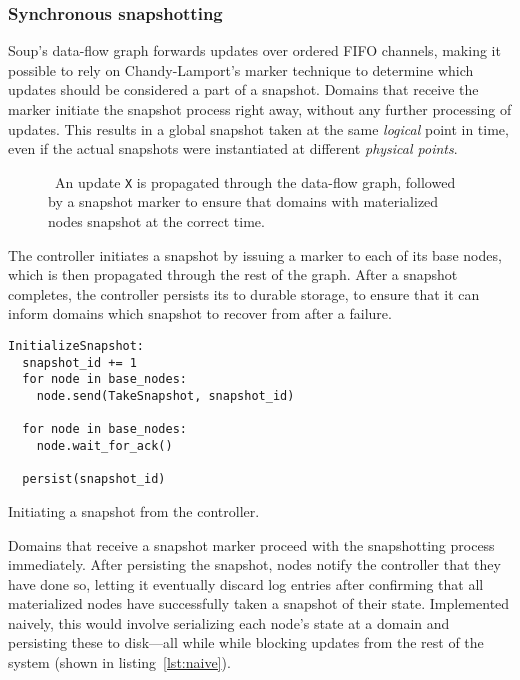 \subsubsection{Synchronous snapshotting}

Soup's data-flow graph forwards updates over ordered FIFO channels, making it
possible to rely on Chandy-Lamport's marker technique to determine which updates
should be considered a part of a snapshot. Domains that receive the
marker initiate the snapshot process right away, without any further processing
of updates. This results in a global snapshot taken at the same \textit{logical}
point in time, even if the actual snapshots were instantiated at different
\textit{physical points}.

\begin{figure}[H]
  \centering
  
  \caption{\
    An update \texttt{X} is propagated through the data-flow graph, followed by
    a snapshot marker to ensure that domains with materialized nodes snapshot at
    the correct time.
  }\label{good-example}
\end{figure}

The controller initiates a snapshot by issuing a  marker to
each of its base nodes, which is then propagated through the rest of the graph.
After a snapshot completes, the controller persists its \code{snapshot\_id} to
durable storage, to ensure that it can inform domains which snapshot to recover
from after a failure.

\begin{listing}[H]
  \begin{verbatim}
InitializeSnapshot:
  snapshot_id += 1
  for node in base_nodes:
    node.send(TakeSnapshot, snapshot_id)

  for node in base_nodes:
    node.wait_for_ack()

  persist(snapshot_id)
  \end{verbatim}

  \caption{Initiating a snapshot from the controller.}
\end{listing}

Domains that receive a snapshot marker proceed with the snapshotting process
immediately. After persisting the snapshot, nodes notify the controller that
they have done so, letting it eventually discard log entries after confirming
that all materialized nodes have successfully taken a snapshot of their state.
Implemented naively, this would involve serializing each node's state at a
domain and persisting these to disk---all while while blocking updates from the
rest of the system (shown in listing~\ref{lst:naive}).


